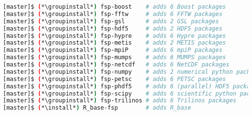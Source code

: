 \begin{lstlisting}[language=bash,keywords={},upquote=true,keepspaces]
[master]$ (*\groupinstall*) fsp-boost    # adds 6 Boost packages
[master]$ (*\groupinstall*) fsp-fftw     # adds 6 FFTW packages
[master]$ (*\groupinstall*) fsp-gsl      # adds 2 GSL packages
[master]$ (*\groupinstall*) fsp-hdf5     # adds 2 HDF5 packages
[master]$ (*\groupinstall*) fsp-hypre    # adds 6 Hypre packages
[master]$ (*\groupinstall*) fsp-metis    # adds 2 METIS packages
[master]$ (*\groupinstall*) fsp-mpiP     # adds 6 mpiP packages
[master]$ (*\groupinstall*) fsp-mumps    # adds 6 MUMPS packages
[master]$ (*\groupinstall*) fsp-netcdf   # adds 6 NetCDF packages
[master]$ (*\groupinstall*) fsp-numpy    # adds 2 numerical python packages
[master]$ (*\groupinstall*) fsp-petsc    # adds 6 PETSC packages
[master]$ (*\groupinstall*) fsp-phdf5    # adds 6 (parallel) HDF5 packages
[master]$ (*\groupinstall*) fsp-scipy    # adds 6 scientific python packages
[master]$ (*\groupinstall*) fsp-trilinos # adds 6 Trilinos packages
[master]$ (*\install*) R_base-fsp        # adds R_base 
\end{lstlisting}
